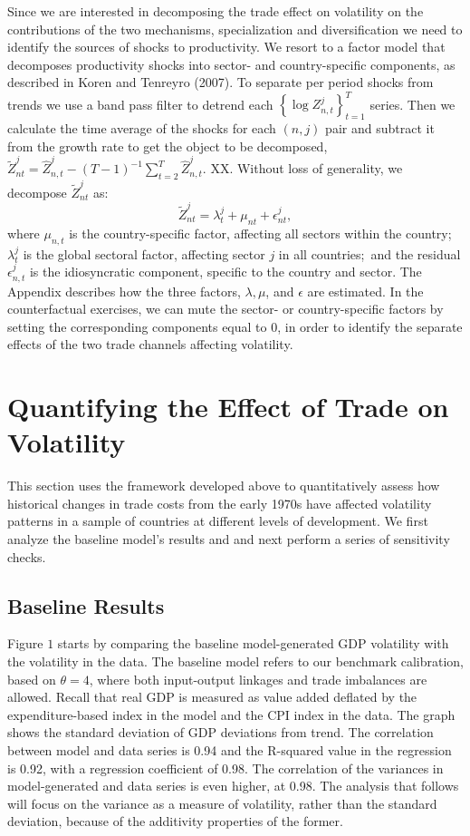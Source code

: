 \documentclass[12pt]{article}
\begin{document}
Since we are interested in decomposing the trade effect on volatility on the
contributions of the two mechanisms, specialization and diversification we
need to identify the sources of shocks to productivity. We resort to a
factor model that decomposes productivity shocks into sector- and
country-specific components, as described in Koren and Tenreyro (2007). To
separate per period shocks from trends we use a band pass filter to detrend
each $\left\{ \log {Z_{n,t}^{j}}\right\} _{t=1}^{T}$ series. Then we
calculate the time average of the shocks for each $(n,j)$ pair and subtract
it from the growth rate to get the object to be decomposed, $\tilde{Z}%
_{nt}^{j}=\hat{Z}_{n,t}^{j}-(T-1)^{-1}\sum_{t=2}^{T}\hat{Z}_{n,t}^{j}$. XX.
Without loss of generality, we decompose $\tilde{Z}_{nt}^{j}$ as: 
\begin{equation*}
\tilde{Z}_{nt}^{j}=\lambda _{t}^{j}+\mu _{nt}+\epsilon _{nt}^{j},
\end{equation*}%
where ${\mu _{n,t}}$ is the country-specific factor, affecting all sectors
within the country; $\lambda _{t}^{j}$ is the global sectoral factor,
affecting sector $j$ in all countries;\ and the residual $\epsilon
_{n,t}^{j} $ is the idiosyncratic component, specific to the country and
sector. The Appendix describes how the three factors, $\lambda ,\mu $, and $%
\epsilon $ are estimated. In the counterfactual exercises, we can mute the
sector- or country-specific factors by setting the corresponding components
equal to 0, in order to identify the separate effects of the two trade
channels affecting volatility.

\section{Quantifying the Effect of Trade on Volatility}

This section uses the framework developed above to quantitatively assess how
historical changes in trade costs from the early 1970s have affected
volatility patterns in a sample of countries at different levels of
development. We first analyze the baseline model's results and and next
perform a series of sensitivity checks.

\subsection{Baseline Results}

Figure $1$ starts by comparing the baseline model-generated GDP volatility
with the volatility in the data. The baseline model refers to our benchmark
calibration, based on $\theta =4$, where both input-output linkages and
trade imbalances are allowed. Recall that real GDP is measured as value
added deflated by the expenditure-based index in the model and the CPI index
in the data. The graph shows the standard deviation of GDP deviations from
trend. The correlation between model and data series is 0.94 and the
R-squared value in the regression is 0.92, with a regression coefficient of
0.98. The correlation of the variances in model-generated and data series is
even higher, at 0.98. The analysis that follows will focus on the variance
as a measure of volatility, rather than the standard deviation, because of
the additivity properties of the former.
\end{document}
